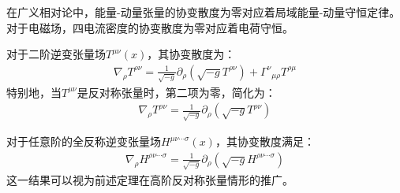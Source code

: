
在广义相对论中，能量-动量张量的协变散度为零对应着局域能量-动量守恒定律。对于电磁场，四电流密度的协变散度为零对应着电荷守恒。

\begin{theorem}[二阶张量场的协变散度]
对于二阶逆变张量场$T^{\mu\nu}(x)$，其协变散度为：
\begin{align}
\nabla_\rho T^{\rho\nu} = \frac{1}{\sqrt{-g}} \partial_\rho (\sqrt{-g} T^{\rho\nu}) + \Gamma^\nu{}_{\mu\rho} T^{\rho\mu}
\end{align}
特别地，当$T^{\mu\nu}$是反对称张量时，第二项为零，简化为：
\begin{align}
\nabla_\rho T^{\rho\nu} = \frac{1}{\sqrt{-g}} \partial_\rho (\sqrt{-g} T^{\rho\nu})
\end{align}
\end{theorem}

\begin{theorem}[全反称张量场的协变散度]
对于任意阶的全反称逆变张量场$H^{\mu\nu\cdots\sigma}(x)$，其协变散度满足：
\begin{align}
\nabla_\rho H^{\rho\nu\cdots\sigma} = \frac{1}{\sqrt{-g}} \partial_\rho (\sqrt{-g} H^{\rho\nu\cdots\sigma})
\end{align}
这一结果可以视为前述定理在高阶反对称张量情形的推广。
\end{theorem}


